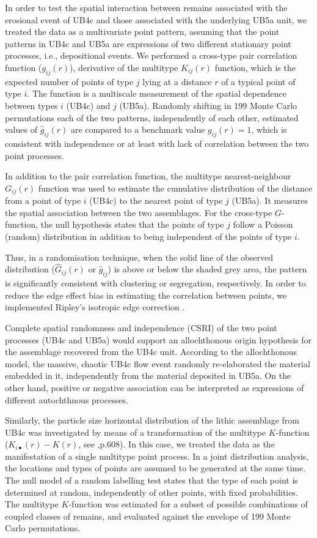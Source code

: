 \documentclass[preprint,authoryear,times]{elsarticle} %
\begin{document}
In order to test the spatial interaction between remains associated with the erosional event of UB4c and those associated with the underlying UB5a unit, we treated the data as a multivariate point pattern, assuming that the point patterns in UB4c and UB5a are expressions of two different stationary point processes, i.e., depositional events. We performed a cross-type pair correlation function ($g_{ij}(r)$), derivative of the multitype $K_{ij}(r)$ function, which is the expected number of points of type $j$ lying at a distance $r$ of a typical point of type $i$. The function is a multiscale measurement of the spatial dependence between types $i$ (UB4c) and $j$ (UB5a). Randomly shifting in 199 Monte Carlo permutations each of the two patterns, independently of each other, estimated values of $\hat{g}_{ij}(r)$ are compared to a benchmark value $g_{ij}(r)=1$, which is consistent with independence or at least with lack of correlation between the two point processes.

In addition to the pair correlation function, the multitype nearest-neighbour $G_{ij}(r)$ function was used to estimate the cumulative distribution of the distance from a point of type $i$ (UB4c) to the nearest point of type $j$ (UB5a). It measures the spatial association between the two assemblages. For the cross-type $G$-function, the null hypothesis states that the points of type $j$ follow a Poisson (random) distribution in addition to being independent of the points of type $i$.

Thus, in a randomisation technique, when the solid line of the observed distribution ($\hat{G}_{ij}(r)$ or $\hat{g}_{ij}$) is above or below the shaded grey area, the pattern is significantly consistent with clustering or segregation, respectively. In order to reduce the edge effect bias in estimating the correlation between points, we implemented Ripley's isotropic edge correction \citep{Ohser1983,Ripley1988}.

Complete spatial randomness and independence (CSRI) of the two point processes (UB4c and UB5a) would support an allochthonous origin hypothesis for the assemblage recovered from the UB4c unit. According to the allochthonous model, the massive, chaotic UB4c flow event randomly re-elaborated the material embedded in it, independently from the material deposited in UB5a. On the other hand, positive or negative association can be interpreted as expressions of different autochthnous processes.

Similarly, the particle size horizontal distribution of the lithic assemblage from UB4c was investigated by means of a transformation of the multitype $K$-function ($K_{i\bullet}(r)-K(r)$, see \cite{spatstatBook},p.608). In this case, we treated the data as the manifestation of a single multitype point process. In a joint distribution analysis, the locations and types of points are assumed to be generated at the same time. The null model of a random labelling test states that the type of each point is determined at random, independently of other points, with fixed probabilities. The multitype $K$-function was estimated for a subset of possible combinations of coupled classes of remains, and evaluated against the envelope of 199 Monte Carlo permutations.
\end{document}

